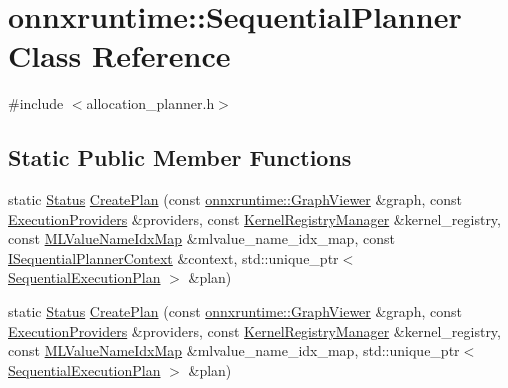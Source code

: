 \hypertarget{classonnxruntime_1_1SequentialPlanner}{}\section{onnxruntime\+:\+:Sequential\+Planner Class Reference}
\label{classonnxruntime_1_1SequentialPlanner}


{\ttfamily \#include $<$allocation\+\_\+planner.\+h$>$}

\subsection*{Static Public Member Functions}
\begin{DoxyCompactItemize}
\item 
static \mbox{\hyperlink{classonnxruntime_1_1common_1_1Status}{Status}} \mbox{\hyperlink{classonnxruntime_1_1SequentialPlanner_af214525da7457a82af57059cde27ef88}{Create\+Plan}} (const \mbox{\hyperlink{classonnxruntime_1_1GraphViewer}{onnxruntime\+::\+Graph\+Viewer}} \&graph, const \mbox{\hyperlink{classonnxruntime_1_1ExecutionProviders}{Execution\+Providers}} \&providers, const \mbox{\hyperlink{classonnxruntime_1_1KernelRegistryManager}{Kernel\+Registry\+Manager}} \&kernel\+\_\+registry, const \mbox{\hyperlink{classonnxruntime_1_1MLValueNameIdxMap}{M\+L\+Value\+Name\+Idx\+Map}} \&mlvalue\+\_\+name\+\_\+idx\+\_\+map, const \mbox{\hyperlink{classonnxruntime_1_1ISequentialPlannerContext}{I\+Sequential\+Planner\+Context}} \&context, std\+::unique\+\_\+ptr$<$ \mbox{\hyperlink{structonnxruntime_1_1SequentialExecutionPlan}{Sequential\+Execution\+Plan}} $>$ \&plan)
\item 
static \mbox{\hyperlink{classonnxruntime_1_1common_1_1Status}{Status}} \mbox{\hyperlink{classonnxruntime_1_1SequentialPlanner_a255b7c44475f0c2f95c6087d3d20027a}{Create\+Plan}} (const \mbox{\hyperlink{classonnxruntime_1_1GraphViewer}{onnxruntime\+::\+Graph\+Viewer}} \&graph, const \mbox{\hyperlink{classonnxruntime_1_1ExecutionProviders}{Execution\+Providers}} \&providers, const \mbox{\hyperlink{classonnxruntime_1_1KernelRegistryManager}{Kernel\+Registry\+Manager}} \&kernel\+\_\+registry, const \mbox{\hyperlink{classonnxruntime_1_1MLValueNameIdxMap}{M\+L\+Value\+Name\+Idx\+Map}} \&mlvalue\+\_\+name\+\_\+idx\+\_\+map, std\+::unique\+\_\+ptr$<$ \mbox{\hyperlink{structonnxruntime_1_1SequentialExecutionPlan}{Sequential\+Execution\+Plan}} $>$ \&plan)
\end{DoxyCompactItemize}


